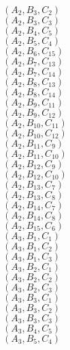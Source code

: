 \documentclass[14pt]{article}
\begin{document}
    $({A}_{2}, {B}_{3}, {C}_{2}) $ \\ 
    $({A}_{2}, {B}_{3}, {C}_{3}) $ \\ 
    $({A}_{2}, {B}_{4}, {C}_{5}) $ \\ 
    $({A}_{2}, {B}_{5}, {C}_{4}) $ \\ 
    $({A}_{2}, {B}_{6}, {C}_{15}) $ \\ 
    $({A}_{2}, {B}_{7}, {C}_{13}) $ \\ 
    $({A}_{2}, {B}_{7}, {C}_{14}) $ \\ 
    $({A}_{2}, {B}_{8}, {C}_{13}) $ \\ 
    $({A}_{2}, {B}_{8}, {C}_{14}) $ \\ 
    $({A}_{2}, {B}_{9}, {C}_{11}) $ \\ 
    $({A}_{2}, {B}_{9}, {C}_{12}) $ \\ 
    $({A}_{2}, {B}_{10}, {C}_{11}) $ \\ 
    $({A}_{2}, {B}_{10}, {C}_{12}) $ \\ 
    $({A}_{2}, {B}_{11}, {C}_{9}) $ \\ 
    $({A}_{2}, {B}_{11}, {C}_{10}) $ \\ 
    $({A}_{2}, {B}_{12}, {C}_{9}) $ \\ 
    $({A}_{2}, {B}_{12}, {C}_{10}) $ \\ 
    $({A}_{2}, {B}_{13}, {C}_{7}) $ \\ 
    $({A}_{2}, {B}_{13}, {C}_{8}) $ \\ 
    $({A}_{2}, {B}_{14}, {C}_{7}) $ \\ 
    $({A}_{2}, {B}_{14}, {C}_{8}) $ \\ 
    $({A}_{2}, {B}_{15}, {C}_{6}) $ \\ 
    $({A}_{3}, {B}_{1}, {C}_{1}) $ \\ 
    $({A}_{3}, {B}_{1}, {C}_{2}) $ \\ 
    $({A}_{3}, {B}_{1}, {C}_{3}) $ \\ 
    $({A}_{3}, {B}_{2}, {C}_{1}) $ \\ 
    $({A}_{3}, {B}_{2}, {C}_{2}) $ \\ 
    $({A}_{3}, {B}_{2}, {C}_{3}) $ \\ 
    $({A}_{3}, {B}_{3}, {C}_{1}) $ \\ 
    $({A}_{3}, {B}_{3}, {C}_{2}) $ \\ 
    $({A}_{3}, {B}_{3}, {C}_{3}) $ \\ 
    $({A}_{3}, {B}_{4}, {C}_{5}) $ \\ 
    $({A}_{3}, {B}_{5}, {C}_{4}) $ \\ 
\end{document}
